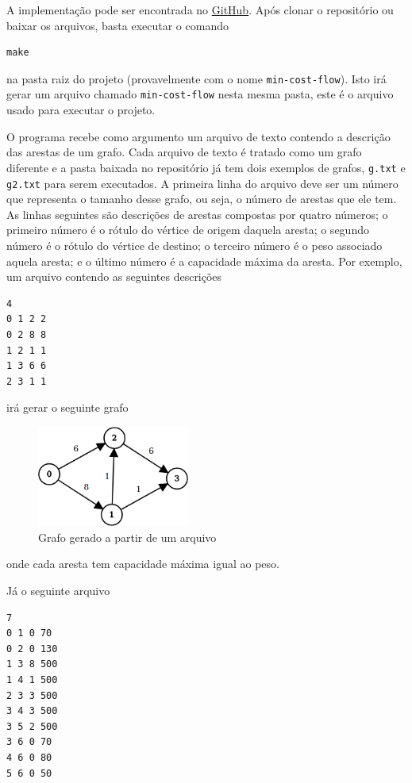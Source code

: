 \documentclass[12pt, a4]{article}
\begin{document}
A implementação pode ser encontrada no
\href{https://github.com/MaxWillf/min-cost-flow}{GitHub}. Após clonar o
repositório ou baixar os arquivos, basta executar o comando

\begin{verbatim}
make
\end{verbatim}

\noindent na pasta raiz do projeto (provavelmente com o nome
\texttt{min-cost-flow}). Isto irá gerar um arquivo chamado
\texttt{min-cost-flow} nesta mesma pasta, este é o arquivo usado para executar o
projeto.

O programa recebe como argumento um arquivo de texto contendo a descrição das
arestas de um grafo. Cada arquivo de texto é tratado como um grafo diferente e a
pasta baixada no repositório já tem dois exemplos de grafos, \texttt{g.txt} e
\texttt{g2.txt} para serem executados. A primeira linha do arquivo deve ser um
número que representa o tamanho desse grafo, ou seja, o número de arestas que
ele tem. As linhas seguintes são descrições de arestas compostas por quatro
números; o primeiro número é o rótulo do vértice de origem daquela aresta; o
segundo número é o rótulo do vértice de destino; o terceiro número é o peso
associado aquela aresta; e o último número é a capacidade máxima da aresta. Por
exemplo, um arquivo contendo as seguintes descrições

\begin{verbatim}
4
0 1 2 2
0 2 8 8
1 2 1 1
1 3 6 6
2 3 1 1
\end{verbatim}

\noindent irá gerar o seguinte grafo

\begin{figure}[H]
  \centering
  \includegraphics[width=5cm]{alg-graph-example.png}
  \caption{Grafo gerado a partir de um arquivo}
  \label{fig:alg-graph-example}
\end{figure}

\noindent onde cada aresta tem capacidade máxima igual ao peso.

Já o seguinte arquivo

\begin{verbatim}
7
0 1 0 70
0 2 0 130
1 3 8 500
1 4 1 500
2 3 3 500
3 4 3 500
3 5 2 500
3 6 0 70
4 6 0 80
5 6 0 50
\end{verbatim}
\end{document}
